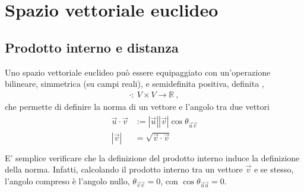 \documentclass[letterpaper,10pt,english]{jupyterBook}
\begin{document}
\section{Spazio vettoriale euclideo}
\label{\detokenize{ch/algebra/vector-algebra-euclidean-space:spazio-vettoriale-euclideo}}\label{\detokenize{ch/algebra/vector-algebra-euclidean-space:math-hs-algebra-vector-euclidean-space}}\label{\detokenize{ch/algebra/vector-algebra-euclidean-space::doc}}
\sphinxAtStartPar
{}

\sphinxAtStartPar
{}


\subsection{Prodotto interno e distanza}
\label{\detokenize{ch/algebra/vector-algebra-euclidean-space:prodotto-interno-e-distanza}}\label{\detokenize{ch/algebra/vector-algebra-euclidean-space:math-hs-algebra-vector-euclidean-space-inner-product}}
\sphinxAtStartPar
Uno spazio vettoriale euclideo può essere equipaggiato con un’operazione bilineare, simmetrica (su campi reali), e semi\sphinxhyphen{}definita positiva, definita ,
\begin{equation*}
\begin{split}\cdot: \ V \times V \rightarrow \mathbb{R} \ ,\end{split}
\end{equation*}
\sphinxAtStartPar
che permette di definire la norma di un vettore e l’angolo tra due vettori
\begin{equation*}
\begin{split}\begin{aligned}
  \vec{u} \cdot \vec{v} & := |\vec{u}||\vec{v}| \cos \theta_{\vec{u} \vec{v}}  \\
              |\vec{v}| & = \sqrt{\vec{v} \cdot \vec{v}}  \\
\end{aligned}\end{split}
\end{equation*}
\sphinxAtStartPar
E’ semplice verificare che la definizione del prodotto interno induce la definizione della norma. Infatti, calcolando il prodotto interno tra un vettore \(\vec{v}\) e se stesso, l’angolo compreso è l’angolo nullo, \(\theta_{\vec{v} \vec{v}} = 0\), con \(\cos \theta_{\vec{u}\vec{u}} = 0\).
\end{document}

